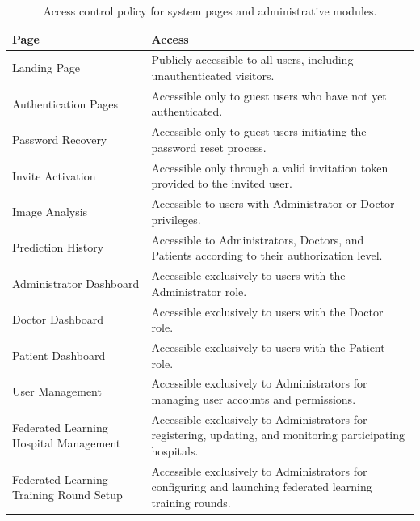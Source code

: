 \begin{table}[htbp]
	\centering
	\caption{Access control policy for system pages and administrative modules.}
	\label{tab:system_page_access_control}
	\begin{tabular}{|p{4cm}|p{6.5cm}|}
		\hline
		\textbf{Page} & \textbf{Access} \\
		\hline
		
		Landing Page &
		Publicly accessible to all users, including unauthenticated visitors. \\
		\hline
		
		Authentication Pages &
		Accessible only to guest users who have not yet authenticated. \\
		\hline
		
		Password Recovery &
		Accessible only to guest users initiating the password reset process. \\
		\hline
		
		Invite Activation &
		Accessible only through a valid invitation token provided to the invited user. \\
		\hline
		
		Image Analysis &
		Accessible to users with Administrator or Doctor privileges. \\
		\hline
		
		Prediction History &
		Accessible to Administrators, Doctors, and Patients according to their authorization level. \\
		\hline
		
		Administrator Dashboard &
		Accessible exclusively to users with the Administrator role. \\
		\hline
		
		Doctor Dashboard &
		Accessible exclusively to users with the Doctor role. \\
		\hline
		
		Patient Dashboard &
		Accessible exclusively to users with the Patient role. \\
		\hline
		
		User Management &
		Accessible exclusively to Administrators for managing user accounts and permissions. \\
		\hline
		
		Federated Learning Hospital Management &
		Accessible exclusively to Administrators for registering, updating, and monitoring participating hospitals. \\
		\hline
		
		Federated Learning Training Round Setup &
		Accessible exclusively to Administrators for configuring and launching federated learning training rounds. \\
		\hline
		
	\end{tabular}
\end{table}

